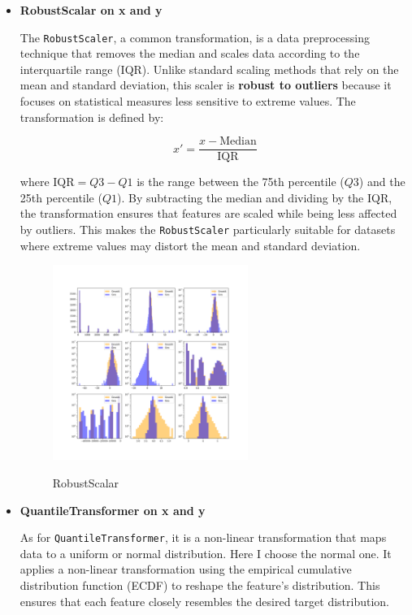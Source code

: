 \begin{itemize}
    \item \textbf{RobustScalar on x and y} 
    
    The \texttt{RobustScaler}, a common transformation, is a data preprocessing technique that removes the median and scales data according to the interquartile range (IQR). Unlike standard scaling methods that rely on the mean and standard deviation, this scaler is \textbf{robust to outliers} because it focuses on statistical measures less sensitive to extreme values. The transformation is defined by:

    \[
    x' = \frac{x - \text{Median}}{\text{IQR}}
    \]
    
    where \( \text{IQR} = Q3 - Q1 \) is the range between the 75th percentile (\(Q3\)) and the 25th percentile (\(Q1\)). By subtracting the median and dividing by the IQR, the transformation ensures that features are scaled while being less affected by outliers. This makes the \texttt{RobustScaler} particularly suitable for datasets where extreme values may distort the mean and standard deviation.
    \begin{figure}[h!]
        \centering
        \includegraphics[width=0.6\textwidth]{Figures/robustscalar.png} \label{fig:robustscalar}
        \caption{RobustScalar}
    \end{figure}

    \item \textbf{QuantileTransformer on x and y}
    
    As for \texttt{QuantileTransformer}, it is a non-linear transformation that maps data to a uniform or normal distribution. Here I choose the normal one.  It applies a non-linear transformation using the empirical cumulative distribution function (ECDF) to reshape the feature's distribution. This ensures that each feature closely resembles the desired target distribution.


\end{itemize}
